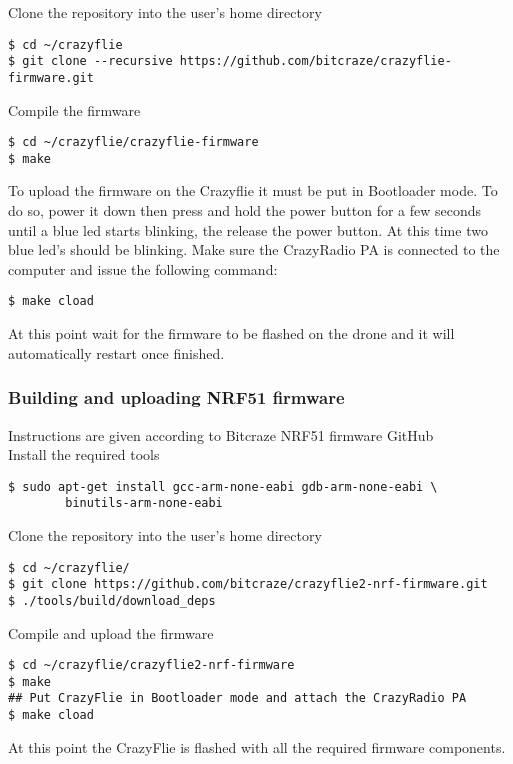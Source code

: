Clone the repository into the user's home directory
\begin{mdframed}[backgroundcolor=light-gray, linecolor=light-gray]
\begin{verbatim}
$ cd ~/crazyflie
$ git clone --recursive https://github.com/bitcraze/crazyflie-firmware.git
\end{verbatim}
\end{mdframed}

Compile the firmware
\begin{mdframed}[backgroundcolor=light-gray, linecolor=light-gray]
\begin{verbatim}
$ cd ~/crazyflie/crazyflie-firmware
$ make
\end{verbatim}
\end{mdframed}


\noindent To upload the firmware on the Crazyflie it must be put in Bootloader mode. To do so, power it down then press and hold the power button for a few seconds until a blue led starts blinking, the release the power button. At this time two blue led's should be blinking. Make sure the CrazyRadio PA is connected to the computer and issue the following command:
\begin{mdframed}[backgroundcolor=light-gray, linecolor=light-gray]
\texttt{\$ make cload}
\end{mdframed}

\noindent At this point wait for the firmware to be flashed on the drone and it will automatically restart once finished.

\subsubsection{Building and uploading NRF51 firmware}
\noindent Instructions are given according to Bitcraze NRF51 firmware GitHub \cite{web_bitcraze_git_fw_nrf}\\

\noindent Install the required tools
\begin{mdframed}[backgroundcolor=light-gray, linecolor=light-gray]
\begin{verbatim}
$ sudo apt-get install gcc-arm-none-eabi gdb-arm-none-eabi \ 
        binutils-arm-none-eabi
\end{verbatim}
\end{mdframed}

Clone the repository into the user’s home directory
\begin{mdframed}[backgroundcolor=light-gray, linecolor=light-gray]
\begin{verbatim}
$ cd ~/crazyflie/
$ git clone https://github.com/bitcraze/crazyflie2-nrf-firmware.git
$ ./tools/build/download_deps
\end{verbatim}
\end{mdframed}
Compile and upload the firmware
\begin{mdframed}[backgroundcolor=light-gray, linecolor=light-gray]
\begin{Verbatim}
$ cd ~/crazyflie/crazyflie2-nrf-firmware
$ make
## Put CrazyFlie in Bootloader mode and attach the CrazyRadio PA
$ make cload
\end{Verbatim}
\end{mdframed}

At this point the CrazyFlie is flashed with all the required firmware components.